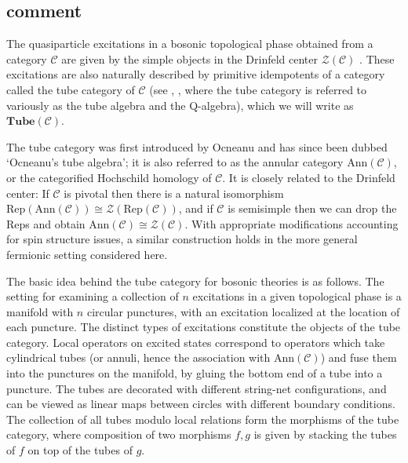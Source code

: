 \documentclass[12pt,a4paper]{article}
\newcommand{\mcz}{\mathcal{Z}}
\newcommand{\mcc}{\mathcal{C}}
\newcommand{\tube}{\textbf{Tube}}
\begin{document}
 


 
\subsection{comment}
The quasiparticle excitations in a bosonic topological phase obtained from a category $\mcc$ are given by the simple objects in the Drinfeld center $\mcz(\mcc)$ \cite{levin2005}.
These excitations are also naturally described by primitive idempotents of a category called the tube category of $\mcc$ (see \cite{ocneanu2001,evans1995,Izumi2000,muger2003b,Bultinck2017}, \cite{Lan2014, Hu2015}, where the tube category is referred to variously as the tube algebra and the Q-algebra), which we will write as $\tube(\mcc)$.

The tube category was first introduced by Ocneanu \cite{ocneanu1994} and has since been dubbed `Ocneanu's tube algebra'; it is also referred to as the annular category $\text{Ann}(\mcc)$, 
or the categorified Hochschild homology of $\mcc$.
It is closely related to the Drinfeld center:
If $\mcc$ is pivotal then there is a natural isomorphism
$\text{Rep}(\text{Ann}(\mcc)) \cong \mcz(\text{Rep}(\mcc))$, and if $\mcc$ is semisimple then we can drop
the $\text{Rep}$s and obtain $\text{Ann}(\mcc) \cong \mcz(\mcc)$.
With appropriate modifications accounting for spin structure issues, a similar construction holds 
in the more general fermionic setting considered here. 



The basic idea behind the tube category for bosonic theories is as follows. 
The setting for examining a collection of $n$ excitations in a given topological phase is a manifold with $n$ circular punctures, with an excitation localized at the location of each puncture. 
The distinct types of excitations constitute the objects of the tube category. 
Local operators on excited states correspond to operators which take cylindrical tubes (or annuli, hence the association with $\text{Ann}(\mcc)$) and fuse them into the punctures on the manifold, by gluing the bottom end of a tube into a puncture.
The tubes are decorated with different string-net configurations, and can be viewed as linear maps between circles with different boundary conditions. 
The collection of all tubes modulo local relations form the morphisms of the tube category, where composition of two morphisms $f,g$ is given by stacking the tubes of $f$ on top of the tubes of $g$. 
\end{document}
